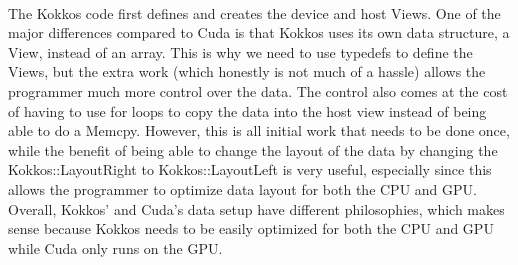 \\
The Kokkos code first defines and creates the device and host Views. One of the
major differences compared to Cuda is that Kokkos uses its own data structure,
a View, instead of an array. This is why we need to use typedefs to define the
Views, but the extra work (which honestly is not much of a hassle) allows the
programmer much more control over the data. The control also comes at the cost
of having to use for loops to copy the data into the host view instead of being
able to do a Memcpy. However, this is all initial work that needs to be done
once, while the benefit of being able to change the layout of the data by
changing the Kokkos::LayoutRight to Kokkos::LayoutLeft is very useful,
especially since this allows the programmer to optimize data layout for both
the CPU and GPU. Overall, Kokkos' and Cuda's data setup have different
philosophies, which makes sense because Kokkos needs to be easily optimized for
both the CPU and GPU while Cuda only runs on the GPU. 

